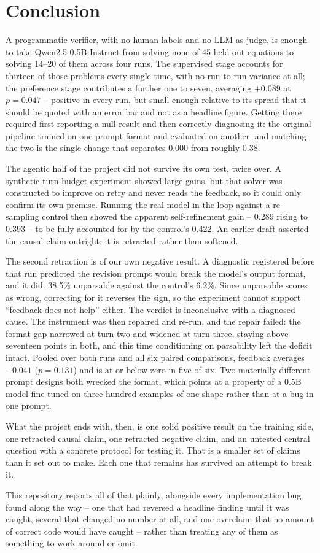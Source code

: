 \documentclass[11pt]{article}
\begin{document}
\section{Conclusion}
A programmatic verifier, with no human labels and no LLM-as-judge, is
enough to take Qwen2.5-0.5B-Instruct from solving none of 45 held-out
equations to solving 14--20 of them across four runs. The supervised stage
accounts for thirteen of those problems every single time, with no
run-to-run variance at all; the preference stage contributes a further one
to seven, averaging $+0.089$ at $p=0.047$ -- positive in every run, but
small enough relative to its spread that it should be quoted with an error
bar and not as a headline figure. Getting there required first reporting a
null result and then correctly diagnosing it: the original pipeline trained
on one prompt format and evaluated on another, and matching the two is the
single change that separates 0.000 from roughly 0.38.

The agentic half of the project did not survive its own test, twice over. A
synthetic turn-budget experiment showed large gains, but that solver was
constructed to improve on retry and never reads the feedback, so it could
only confirm its own premise. Running the real model in the loop against a
re-sampling control then showed the apparent self-refinement gain -- 0.289
rising to 0.393 -- to be fully accounted for by the control's 0.422. An
earlier draft asserted the causal claim outright; it is retracted rather
than softened.

The second retraction is of our own negative result. A diagnostic
registered before that run predicted the revision prompt would break the
model's output format, and it did: 38.5\% unparsable against the control's
6.2\%. Since unparsable scores as wrong, correcting for it reverses the
sign, so the experiment cannot support ``feedback does not help'' either.
The verdict is inconclusive with a diagnosed cause. The instrument was then
repaired and re-run, and the repair failed: the format gap narrowed at turn
two and widened at turn three, staying above seventeen points in both, and
this time conditioning on parsability left the deficit intact. Pooled over
both runs and all six paired comparisons, feedback averages $-0.041$
($p=0.131$) and is at or below zero in five of six. Two materially different
prompt designs both wrecked the format, which points at a property of a 0.5B
model fine-tuned on three hundred examples of one shape rather than at a bug
in one prompt.

What the project ends with, then, is one solid positive result on the
training side, one retracted causal claim, one retracted negative claim,
and an untested central question with a concrete protocol for testing it.
That is a smaller set of claims than it set out to make. Each one that
remains has survived an attempt to break it.

This repository reports all of that plainly, alongside every implementation
bug found along the way -- one that had reversed a headline finding until
it was caught, several that changed no number at all, and one overclaim
that no amount of correct code would have caught -- rather than treating
any of them as something to work around or omit.
\end{document}
